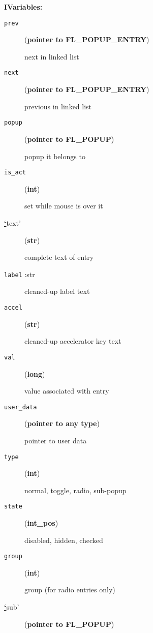 \textbf{IVariables:} %
\begin{description}
\item[{\texttt{prev}}] \leavevmode (\textbf{pointer to FL\_POPUP\_ENTRY})

next in linked list

\item[{\texttt{next}}] \leavevmode (\textbf{pointer to FL\_POPUP\_ENTRY})

previous in linked list

\item[{\texttt{popup}}] \leavevmode (\textbf{pointer to FL\_POPUP})

popup it belongs to

\item[{\texttt{is\_act}}] \leavevmode (\textbf{int})

set while mouse is over it

\item[{%
\hyperlink{id1}{\textbf{\color{red}`}}text'}] \leavevmode (\textbf{str})

complete text of entry

\item[{\texttt{label}  :str}] \leavevmode 
cleaned-up label text

\item[{\texttt{accel}}] \leavevmode (\textbf{str})

cleaned-up accelerator key text

\item[{\texttt{val}}] \leavevmode (\textbf{long})

value associated with entry

\item[{\texttt{user\_data}}] \leavevmode (\textbf{pointer to any type})

pointer to user data

\item[{\texttt{type}}] \leavevmode (\textbf{int})

normal, toggle, radio, sub-popup

\item[{\texttt{state}}] \leavevmode (\textbf{int\_pos})

disabled, hidden, checked

\item[{\texttt{group}}] \leavevmode (\textbf{int})

group (for radio entries only)

\item[{%
\hyperlink{id3}{\textbf{\color{red}`}}sub'}] \leavevmode (\textbf{pointer to FL\_POPUP})


\end{description}
